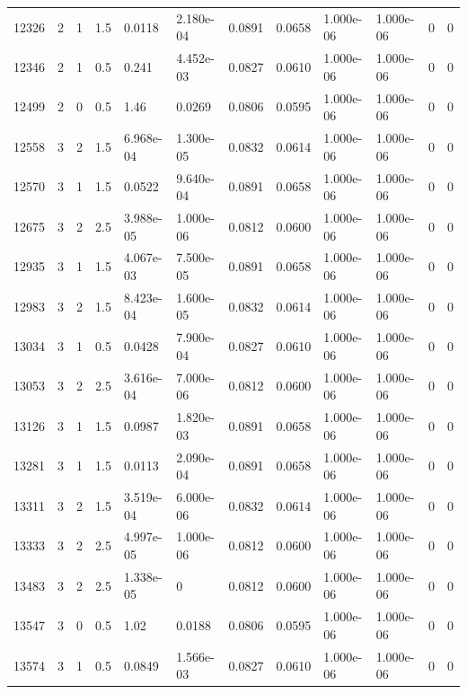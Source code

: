 \documentclass[preview]{standalone}
\begin{document}
{{{{{\begin{tabular}{L{1.2cm}C{1.2cm} C{0.3cm}C{0.5cm} C{1.4cm}C{1.4cm} C{1.4cm}C{1.4cm} C{1.6cm}C{1.6cm} C{1.6cm}C{1.6cm}}
  12326  &     2  & 1     & 1.5 &  0.0118  & 2.180e-04  &  0.0891&   0.0658& 1.000e-06 & 1.000e-06   &  0 & 0  \\ 
  12346  &     2  & 1     & 0.5 &  0.241  & 4.452e-03  &  0.0827&   0.0610& 1.000e-06 & 1.000e-06   &  0 & 0  \\ 
  12499  &     2  & 0     & 0.5 &  1.46  & 0.0269  &  0.0806&   0.0595& 1.000e-06 & 1.000e-06   &  0 & 0  \\ 
  12558  &     3  & 2     & 1.5 &  6.968e-04  & 1.300e-05  &  0.0832&   0.0614& 1.000e-06 & 1.000e-06   &  0 & 0  \\ 
  12570  &     3  & 1     & 1.5 &  0.0522  & 9.640e-04  &  0.0891&   0.0658& 1.000e-06 & 1.000e-06   &  0 & 0  \\ 
  12675  &     3  & 2     & 2.5 &  3.988e-05  & 1.000e-06  &  0.0812&   0.0600& 1.000e-06 & 1.000e-06   &  0 & 0  \\ 
  12935  &     3  & 1     & 1.5 &  4.067e-03  & 7.500e-05  &  0.0891&   0.0658& 1.000e-06 & 1.000e-06   &  0 & 0  \\ 
  12983  &     3  & 2     & 1.5 &  8.423e-04  & 1.600e-05  &  0.0832&   0.0614& 1.000e-06 & 1.000e-06   &  0 & 0  \\ 
  13034  &     3  & 1     & 0.5 &  0.0428  & 7.900e-04  &  0.0827&   0.0610& 1.000e-06 & 1.000e-06   &  0 & 0  \\ 
  13053  &     3  & 2     & 2.5 &  3.616e-04  & 7.000e-06  &  0.0812&   0.0600& 1.000e-06 & 1.000e-06   &  0 & 0  \\ 
  13126  &     3  & 1     & 1.5 &  0.0987  & 1.820e-03  &  0.0891&   0.0658& 1.000e-06 & 1.000e-06   &  0 & 0  \\ 
  13281  &     3  & 1     & 1.5 &  0.0113  & 2.090e-04  &  0.0891&   0.0658& 1.000e-06 & 1.000e-06   &  0 & 0  \\ 
  13311  &     3  & 2     & 1.5 &  3.519e-04  & 6.000e-06  &  0.0832&   0.0614& 1.000e-06 & 1.000e-06   &  0 & 0  \\ 
  13333  &     3  & 2     & 2.5 &  4.997e-05  & 1.000e-06  &  0.0812&   0.0600& 1.000e-06 & 1.000e-06   &  0 & 0  \\ 
  13483  &     3  & 2     & 2.5 &  1.338e-05  & 0  &  0.0812&   0.0600& 1.000e-06 & 1.000e-06   &  0 & 0  \\ 
  13547  &     3  & 0     & 0.5 &  1.02  & 0.0188  &  0.0806&   0.0595& 1.000e-06 & 1.000e-06   &  0 & 0  \\ 
  13574  &     3  & 1     & 0.5 &  0.0849  & 1.566e-03  &  0.0827&   0.0610& 1.000e-06 & 1.000e-06   &  0 & 0  \\ 

\end{tabular}}}}}}
\end{document}
